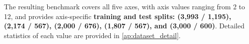 The resulting benchmark covers all five axes, with axis values ranging from 2 to 12, and provides axis-specific \textbf{training and test splits: \depth (3,993 / 1,195), \horizon (2,174 / 567), \breadth (2,000 / 676), \myparallel (1,807 / 567), and \robustness (3,000 / 600)}. Detailed statistics of each value are provided in \cref{ap:dataset_detail}. %










